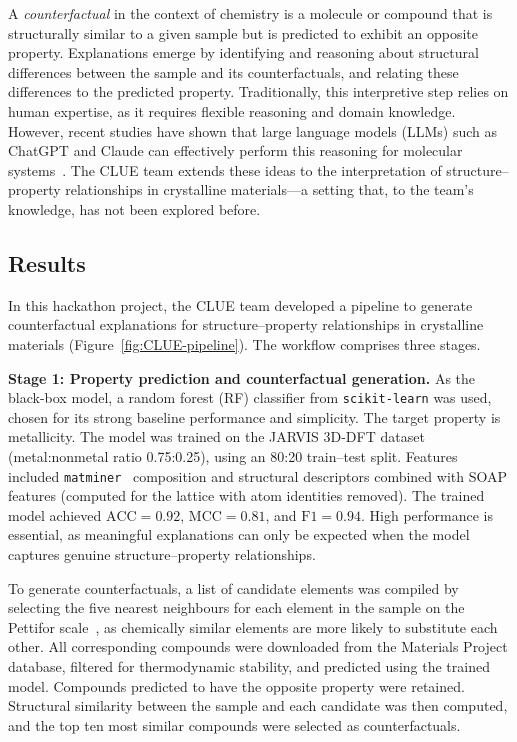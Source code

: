 A \textit{counterfactual} in the context of chemistry is a molecule or compound that is structurally similar to a given sample but is predicted to exhibit an opposite property. Explanations emerge by identifying and reasoning about structural differences between the sample and its counterfactuals, and relating these differences to the predicted property. Traditionally, this interpretive step relies on human expertise, as it requires flexible reasoning and domain knowledge. However, recent studies have shown that large language models (LLMs) such as ChatGPT and Claude can effectively perform this reasoning for molecular systems~\cite{Wellawatte2025}.  
The CLUE team extends these ideas to the interpretation of structure–property relationships in crystalline materials—a setting that, to the team’s knowledge, has not been explored before.

\subsection*{Results}
In this hackathon project, the CLUE team developed a pipeline to generate counterfactual explanations for structure–property relationships in crystalline materials (Figure~\ref{fig:CLUE-pipeline}). The workflow comprises three stages.

\textbf{Stage 1: Property prediction and counterfactual generation.}  
As the black-box model, a random forest (RF) classifier from \texttt{scikit-learn} was used, chosen for its strong baseline performance and simplicity. The target property is metallicity. The model was trained on the JARVIS 3D-DFT dataset~\cite{Choudhary2020} (metal:nonmetal ratio 0.75:0.25), using an 80:20 train–test split. Features included \texttt{matminer}~\cite{ward2018matminer} composition and structural descriptors combined with SOAP features (computed for the lattice with atom identities removed). The trained model achieved $\mathrm{ACC}=0.92$, $\mathrm{MCC}=0.81$, and $\mathrm{F1}=0.94$. High performance is essential, as meaningful explanations can only be expected when the model captures genuine structure–property relationships.

To generate counterfactuals, a list of candidate elements was compiled by selecting the five nearest neighbours for each element in the sample on the Pettifor scale~\cite{Pettifor1984}, as chemically similar elements are more likely to substitute each other. All corresponding compounds were downloaded from the Materials Project database, filtered for thermodynamic stability, and predicted using the trained model. Compounds predicted to have the opposite property were retained. Structural similarity between the sample and each candidate was then computed, and the top ten most similar compounds were selected as counterfactuals.

